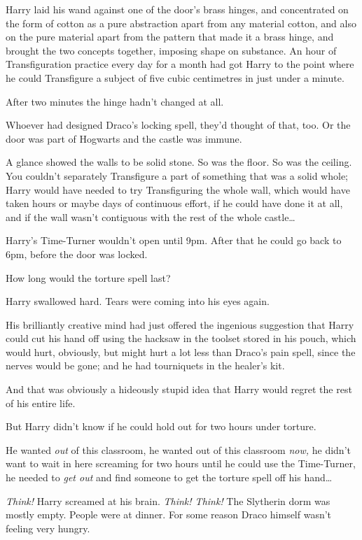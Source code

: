 Harry laid his wand against one of the door's brass hinges, and concentrated on
the form of cotton as a pure abstraction apart from any material cotton, and
also on the pure material apart from the pattern that made it a brass hinge,
and brought the two concepts together, imposing shape on substance. An hour of
Transfiguration practice every day for a month had got Harry to the point
where he could Transfigure a subject of five cubic centimetres in just under a
minute.

After two minutes the hinge hadn't changed at all.

Whoever had designed Draco's locking spell, they'd thought of that, too. Or the
door was part of Hogwarts and the castle was immune.

A glance showed the walls to be solid stone. So was the floor. So was the
ceiling. You couldn't separately Transfigure a part of something that was a
solid whole; Harry would have needed to try Transfiguring the whole wall, which
would have taken hours or maybe days of continuous effort, if he could have
done it at all, and if the wall wasn't contiguous with the rest of the whole
castle…

Harry's Time-Turner wouldn't open until 9pm. After that he could go back to
6pm, before the door was locked.

How long would the torture spell last?

Harry swallowed hard. Tears were coming into his eyes again.

His brilliantly creative mind had just offered the ingenious suggestion that
Harry could cut his hand off using the hacksaw in the toolset stored in his
pouch, which would hurt, obviously, but might hurt a lot less than Draco's pain
spell, since the nerves would be gone; and he had tourniquets in the healer's
kit.

And that was obviously a hideously stupid idea that Harry would regret the rest
of his entire life.

But Harry didn't know if he could hold out for two hours under torture.

He wanted \emph{out} of this classroom, he wanted out of this classroom
\emph{now,} he didn't want to wait in here screaming for two hours until he
could use the Time-Turner, he needed to \emph{get out} and find someone to get
the torture spell off his hand…

\emph{Think!} Harry screamed at his brain. \emph{Think! Think!}
\later
The Slytherin dorm was mostly empty. People were at dinner. For some reason
Draco himself wasn't feeling very hungry.

